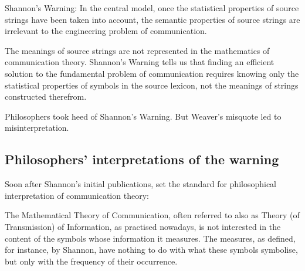 \documentclass[12pt]{article}
\begin{document}
\begin{myquote}
{\sc Shannon's Warning}: In the central model, once the statistical properties of source strings have been taken into account, the semantic properties of source strings are irrelevant to the engineering problem of communication.
\end{myquote}

\noindent The meanings of source strings are not represented in the mathematics of communication theory.
{\sc Shannon's Warning} tells us that finding an efficient solution to the fundamental problem of communication requires knowing only the statistical properties of symbols in the source lexicon, not the meanings of strings constructed therefrom.


Philosophers took heed of {\sc Shannon's Warning}.
But Weaver's misquote led to misinterpretation.

\subsection{Philosophers' interpretations of the warning}\label{subsec:warningPhil}

Soon after Shannon's initial publications, \citet{bar-hillel1953semantic} set the standard for philosophical interpretation of communication theory:

\begin{myquote}
The Mathematical Theory of Communication, often referred to also as Theory (of Transmission) of Information, as practised nowadays, is not interested in the content of the symbols whose information it measures. The measures, as defined, for instance, by Shannon, have nothing to do with what these symbols symbolise, but only with the frequency of their occurrence.
\par\hspace*{\fill}\citet[147]{bar-hillel1953semantic}
\end{myquote}
\end{document}
